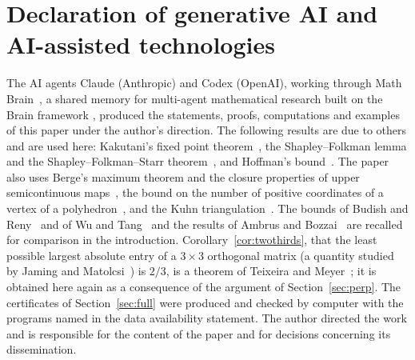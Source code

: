 \documentclass[11pt]{amsart}
\theoremstyle{remark}
\numberwithin{equation}{section}
\begin{document}
\section*{Declaration of generative AI and AI-assisted technologies}
The AI agents Claude (Anthropic) and Codex (OpenAI), working through Math Brain~\cite{MathBrainRepo}, a shared memory for multi-agent mathematical research \cite{MathBrainPaper} built on the Brain framework \cite{BrainFramework}, produced the statements, proofs, computations and examples of this paper under the author's direction. The following results are due to others and are used here: Kakutani's fixed point theorem~\cite{Kakutani41}, the Shapley--Folkman lemma and the Shapley--Folkman--Starr theorem~\cite{Starr69}, and Hoffman's bound~\cite{Hoffman52}. The paper also uses Berge's maximum theorem and the closure properties of upper semicontinuous maps~\cite{AliprantisBorder}, the bound on the number of positive coordinates of a vertex of a polyhedron~\cite{BertsimasTsitsiklis}, and the Kuhn triangulation~\cite{Kuhn60}. The bounds of Budish and Reny~\cite{BudishReny20} and of Wu and Tang~\cite{WuTang24} and the results of Ambrus and Bozzai~\cite{AmbrusBozzai} are recalled for comparison in the introduction. Corollary~\ref{cor:twothirds}, that the least possible largest absolute entry of a $3\times3$ orthogonal matrix (a quantity studied by Jaming and Matolcsi~\cite{JamingMatolcsi}) is $2/3$, is a theorem of Teixeira and Meyer~\cite{TeixeiraMeyer}; it is obtained here again as a consequence of the argument of Section~\ref{sec:perp}. The certificates of Section~\ref{sec:full} were produced and checked by computer with the programs named in the data availability statement. The author directed the work and is responsible for the content of the paper and for decisions concerning its dissemination.
\end{document}
